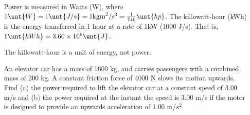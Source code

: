 \documentclass[11pt]{article}
\begin{document}
Power is measured in Watts (W), where $1 \unt{W} = 1 \unt{J/s} = 1 \text{kgm}^2/\text{s}^3 = \frac{1}{746} \unt{hp}$. The killowatt-hour (kWh) is the energy transferred in 1 hour at a rate of 1kW (1000 J/s). That is, $1 \unt{kWh} = 3.60 \times 10^6 \unt{J}$.
\begin{remark}
	The killowatt-hour is a unit of energy, not power.
\end{remark}

\begin{example}
	An elevator car has a mass of 1600 kg, and carries passengers with a combined mass of 200 kg. A constant friction force of 4000 N slows its motion upwards. Find (a) the power required to lift the elevator car at a constant speed of 3.00 m/s and (b) the power required at the instant the speed is 3.00 m/s if the motor is designed to provide an upwards acceleration of 1.00 m/$s^2$
\end{example}
\end{document}

